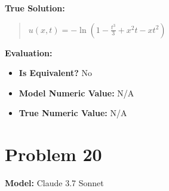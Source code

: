 \documentclass{article}
\begin{document}
\textbf{True Solution:}
\begin{quote}
$u(x, t) = -\ln\left(1 - \frac{t^3}{3} + x^2 t - x t^2\right)$
\end{quote}

\textbf{Evaluation:}
\begin{itemize}
\item \textbf{Is Equivalent?} No
\item \textbf{Model Numeric Value:} N/A
\item \textbf{True Numeric Value:} N/A
\end{itemize}
\vspace{1cm}
\section*{Problem 20}
\textbf{Model:} Claude 3.7 Sonnet
\end{document}
